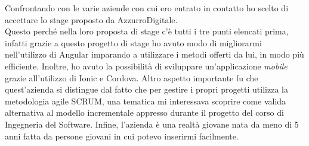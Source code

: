 Confrontando con le varie aziende con cui ero entrato in contatto ho scelto di accettare lo stage proposto da AzzurroDigitale. \\
Questo perché nella loro proposta di stage c'è tutti i tre punti elencati prima, infatti grazie a questo progetto di stage ho avuto modo di migliorarmi nell’utilizzo di Angular imparando a utilizzare i metodi offerti da lui, in modo più efficiente. Inoltre, ho avuto la possibilità di sviluppare un’applicazione \emph{mobile} grazie all'utilizzo di Ionic e Cordova. Altro aspetto importante fu che quest'azienda si distingue dal fatto che per gestire i propri progetti utilizza la metodologia agile \gls{SCRUM}, una tematica mi interessava scoprire come valida alternativa al modello incrementale appresso durante il progetto del corso di Ingegneria del Software. Infine, l'azienda è una realtà giovane nata da meno di 5 anni fatta da persone giovani in cui potevo inserirmi facilmente.\\
